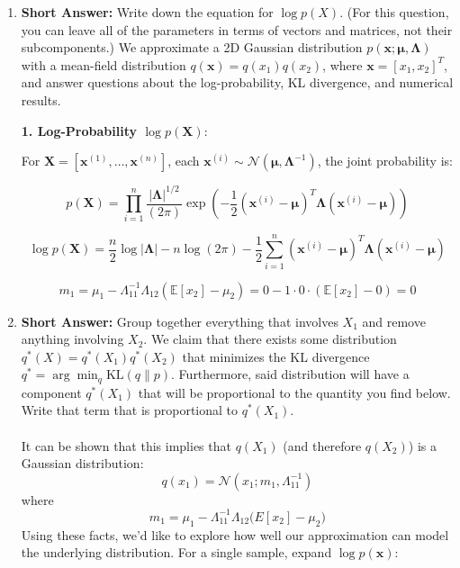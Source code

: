 \documentclass[a3paper,12pt]{extarticle} %
\begin{document}
\begin{enumerate}
    \item \textbf{Short Answer:} Write down the equation for \( \log p(X) \). (For this question, you can leave all of the parameters in terms of vectors and matrices, not their subcomponents.)
    We approximate a 2D Gaussian distribution \(p(\mathbf{x}; \boldsymbol{\mu}, \boldsymbol{\Lambda})\) with a mean-field distribution \(q(\mathbf{x}) = q(x_1) q(x_2)\), where \(\mathbf{x} = [x_1, x_2]^T\), and answer questions about the log-probability, KL divergence, and numerical results.

\textbf{1. Log-Probability \(\log p(\mathbf{X})\)}:

For \(\mathbf{X} = [\mathbf{x}^{(1)}, \dots, \mathbf{x}^{(n)}]\), each \(\mathbf{x}^{(i)} \sim \mathcal{N}(\boldsymbol{\mu}, \boldsymbol{\Lambda}^{-1})\), the joint probability is:

\[
p(\mathbf{X}) = \prod_{i=1}^n \frac{|\boldsymbol{\Lambda}|^{1/2}}{(2\pi)} \exp\left( -\frac{1}{2} (\mathbf{x}^{(i)} - \boldsymbol{\mu})^T \boldsymbol{\Lambda} (\mathbf{x}^{(i)} - \boldsymbol{\mu}) \right)
\]

\[
\log p(\mathbf{X}) = \frac{n}{2} \log |\boldsymbol{\Lambda}| - n \log (2\pi) - \frac{1}{2} \sum_{i=1}^n (\mathbf{x}^{(i)} - \boldsymbol{\mu})^T \boldsymbol{\Lambda} (\mathbf{x}^{(i)} - \boldsymbol{\mu})
\]

\[
m_1 = \mu_1 - \Lambda_{11}^{-1} \Lambda_{12} (\mathbb{E}[x_2] - \mu_2) = 0 - 1 \cdot 0 \cdot (\mathbb{E}[x_2] - 0) = 0
\]
    \item \textbf{Short Answer:} Group together everything that involves \( X_1 \) and remove anything involving \( X_2 \). We claim that there exists some distribution \( q^*(X) = q^*(X_1)q^*(X_2) \) that minimizes the KL divergence \( q^* = \arg\min_q \text{KL}(q \| p) \). Furthermore, said distribution will have a component \( q^*(X_1) \) that will be proportional to the quantity you find below. Write that term that is proportional to \( q^*(X_1) \).
    \\\\ It can be shown that this implies that \( q(X_1) \) (and therefore \( q(X_2) \)) is a Gaussian distribution:
    \[
    q(x_1) = \mathcal{N} \left( x_1; m_1, \Lambda_{11}^{-1} \right)
    \]
    where 
    \[
    m_1 = \mu_1 - \Lambda_{11}^{-1} \Lambda_{12} \big(E[x_2] - \mu_2\big)
    \]
    Using these facts, we’d like to explore how well our approximation can model the underlying distribution.
    For a single sample, expand \(\log p(\mathbf{x})\):


\end{enumerate}
\end{document}

